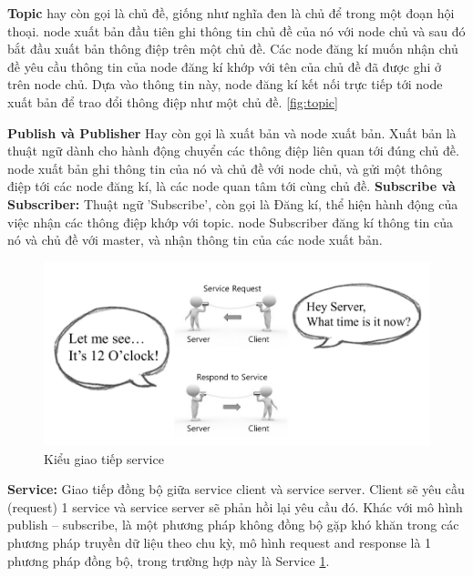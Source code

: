 \textbf{Topic} hay còn gọi là chủ đề, giống như nghĩa đen là chủ để trong một đoạn hội thoại. node xuất bản đầu tiên ghi thông tin chủ đề của nó với node chủ và sau đó bắt đầu xuất bản thông điệp trên một chủ đề. Các node đăng kí muốn nhận chủ đề yêu cầu thông tin của node đăng kí khớp với tên của chủ đề đã được ghi ở trên node chủ. Dựa vào thông tin này, node đăng kí kết nối trực tiếp tới node xuất bản để trao đổi thông điệp như một chủ đề. \figurename{\ref{fig:topic}}

\textbf{Publish và Publisher} Hay còn gọi là xuất bản và node xuất bản. Xuất bản là thuật ngữ dành cho hành động chuyển các thông điệp liên quan tới đúng chủ đề. node xuất bản ghi thông tin của nó và chủ đề với node chủ, và gửi một thông điệp tới các node đăng kí, là các node quan tâm tới cùng chủ đề. 
\textbf{Subscribe và Subscriber:} Thuật ngữ 'Subscribe', còn gọi là Đăng kí, thể hiện hành động của việc nhận các thông điệp khớp với topic. node Subscriber đăng kí thông tin của nó và chủ đề với master, và nhận thông tin của các node xuất bản. 

\begin{figure}[htbp]
  \centering
  \includegraphics[width=0.9\linewidth]{figures/service.png}
  \caption{Kiểu giao tiếp service}
  \label{fig:service}
\end{figure}
\textbf{Service: } Giao tiếp đồng bộ giữa service client và service server. Client sẽ yêu cầu (request) 1 service và service server sẽ phản hồi lại yêu cầu đó. Khác với mô hình publish – subscribe, là một phương pháp không đồng bộ gặp khó khăn trong các phương pháp truyền dữ liệu theo chu kỳ, mô hình request and response là 1 phương pháp đồng bộ, trong trường hợp này là Service \figurename{\ref{fig:service}}.

